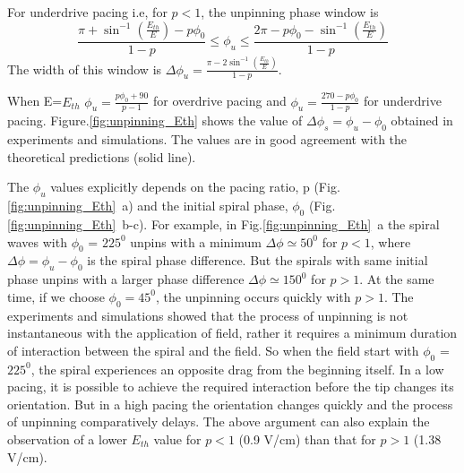 \documentclass[%
 preprint,
 amsmath,amssymb,
 aps,
]{revtex4-2}
\begin{document}
For underdrive pacing i.e, for $p<1$, the unpinning phase window is 
\begin{equation}
\frac{\pi+ {\sin^{-1}}(\frac{E_{th}}{E})-p \phi_0}{1-p}   \leq \phi_u \leq \frac{2\pi-p \phi_0-{\sin^{-1}}(\frac{E_{th}}{E})}{1-p}
\label{eq:underdrive}
\end{equation}
The width of this window is $\Delta\phi_u = \frac{\pi - 2 \sin^{-1}(\frac{E_{th}}{E})}{1-p}$.


When E=$E_{th}$ $\phi_u = \frac{p \phi_0+ 90}{p-1}$ for overdrive pacing and $\phi_u = \frac{270-p \phi_0}{1-p}$ for underdrive pacing. Figure.\ref{fig:unpinning_Eth} shows the value of $\Delta\phi_s = \phi_u - \phi_0$ obtained in experiments and simulations. The values are in good agreement with the theoretical predictions (solid line). 

The $\phi_{u}$ values explicitly depends on the pacing ratio, p (Fig.\ref{fig:unpinning_Eth}~a) and the initial spiral phase, $\phi_{0}$ (Fig.\ref{fig:unpinning_Eth}~b-c). For example, in Fig.\ref{fig:unpinning_Eth}~a the spiral waves with $\phi_{0}$ = $225^0$ unpins with a minimum $\Delta\phi \simeq 50^0$ for $p<1$, where $\Delta\phi = \phi_{u} - \phi_{0}$ is the spiral phase difference. But the spirals with same initial phase unpins with a larger phase difference $\Delta\phi \simeq 150^0$ for $p>1$. At the same time, if we choose $\phi_{0} = 45^0$, the unpinning occurs quickly with $p>1$. 
The experiments and simulations showed that the process of unpinning is not instantaneous with the application of field, rather it requires a minimum duration of interaction between the spiral and the field. So when the field start with $\phi_{0}$ = $225^0$, the spiral experiences an opposite drag from the beginning itself. In a low pacing, it is possible to achieve the required interaction before the tip changes its orientation. But in a high pacing the orientation changes quickly and the process of unpinning comparatively delays. 
The above argument can also explain the observation of a lower $E_{th}$ value for $p<1$ (0.9 V/cm) than that for $p>1$ (1.38 V/cm).
\end{document}
